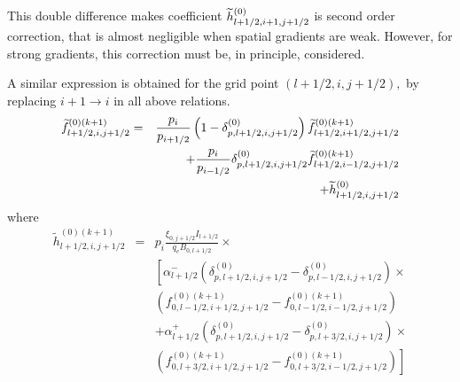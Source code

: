 This double difference makes coefficient $\widetilde{h}_{l+1/2,i+1,j+1/2}^{%
\left( 0\right) }$ is second order correction, that is almost negligible
when spatial gradients are weak. However, for strong gradients, this
correction must be, in principle, considered.

A similar expression is obtained for the grid point $\left(
l+1/2,i,j+1/2\right) ,$ by replacing $i+1\rightarrow i$ in all above
relations.
\begin{eqnarray}
\widetilde{f}_{l+1/2,i,j+1/2}^{\left( 0\right) (k+1)} &=&\frac{p_{i}}{%
p_{i+1/2}}\left( 1-\delta _{p,l+1/2,i,j+1/2}^{(0)}\right) \widetilde{f}%
_{l+1/2,i+1/2,j+1/2}^{(0)(k+1)}  \nonumber \\
&&+\frac{p_{i}}{p_{i-1/2}}\delta _{p,l+1/2,i,j+1/2}^{(0)}\widetilde{f}%
_{l+1/2,i-1/2,j+1/2}^{(0)(k+1)}  \nonumber \\
&&+\widetilde{h}_{l+1/2,i,j+1/2}^{\left( 0\right) }
\end{eqnarray}
where
\begin{eqnarray}
\widetilde{h}_{l+1/2,i,j+1/2}^{\left( 0\right) (k+1)} &=&p_{i}\frac{\xi
_{0,j+1/2}I_{l+1/2}}{q_{e}B_{0,l+1/2}}\times   \nonumber \\
&&\left[ \alpha _{l+1/2}^{-}\left( \delta _{p,l+1/2,i,j+1/2}^{(0)}-\delta
_{p,l-1/2,i,j+1/2}^{(0)}\right) \times \right.   \nonumber \\
&&\left(
f_{0,l-1/2,i+1/2,j+1/2}^{(0)(k+1)}-f_{0,l-1/2,i-1/2,j+1/2}^{(0)(k+1)}\right)
\nonumber \\
&&+\alpha _{l+1/2}^{+}\left( \delta _{p,l+1/2,i,j+1/2}^{(0)}-\delta
_{p,l+3/2,i,j+1/2}^{(0)}\right) \times   \nonumber \\
&&\left. \left(
f_{0,l+3/2,i+1/2,j+1/2}^{(0)(k+1)}-f_{0,l+3/2,i-1/2,j+1/2}^{(0)(k+1)}\right)
\right]   \label{dkegridinterp2}
\end{eqnarray}

